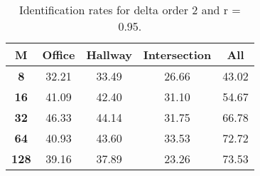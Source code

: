 \begin{table}[h]
    \small
    \centering
    \begin{tabular}{|c|c|c|c|l|}    
    \hline
    {\bf M} & {\bf Office} & {\bf Hallway} & {\bf Intersection} &     \multicolumn{1}{c|}{{\bf All}} \\ \hline
    {\bf 8} & 32.21 & 33.49 & 26.66 & 43.02 \\ \hline
    {\bf 16} & 41.09 & 42.40 & 31.10 & 54.67 \\ \hline
    {\bf 32} & 46.33 & 44.14 & 31.75 & 66.78 \\ \hline
    {\bf 64} & 40.93 & 43.60 & 33.53 & 72.72 \\ \hline
    {\bf 128} & 39.16 & 37.89 & 23.26 & 73.53 \\ \hline
    \end{tabular}
    \caption{Identification rates for delta order 2 and r = 0.95.}    
    \label{tab:identify_speakers_0.95_mit_19_2}
\end{table}

